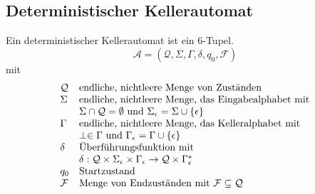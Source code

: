 \documentclass[]{beamer}
\begin{document}
\subsection{Deterministischer Kellerautomat}
\begin{frame}[squeeze]{}
  \begin{definition}
    Ein deterministischer Kellerautomat ist ein 6-Tupel.
    \[\mathcal{A} = (\mathcal{Q}, \Sigma, \Gamma, \delta, q_0, \mathcal{F})\]
    mit
    \[\begin{array}{l l}
        \mathcal{Q} & \text{endliche, nichtleere Menge von Zuständen} \\
        \Sigma      & \text{endliche, nichtleere Menge, das Eingabealphabet mit} \\
                    & \Sigma \cap \mathcal{Q} = \emptyset \text{ und } \Sigma_\epsilon = \Sigma \cup \{\epsilon\} \\
        \Gamma      & \text{endliche, nichtleere Menge, das Kelleralphabet mit} \\
                    & \perp \in \Gamma \text{ und } \Gamma_\epsilon = \Gamma \cup \{\epsilon\} \\
        \delta      & \text{Überführungsfunktion mit } \\
                    &\delta : \mathcal{Q} \times \Sigma_\epsilon \times \Gamma_\epsilon \rightarrow \mathcal{Q} \times \Gamma_\epsilon^*\\
        q_0         & \text{Startzustand} \\
        \mathcal{F} & \text{Menge von Endzuständen mit } \mathcal{F} \subseteq \mathcal{Q} \\
      \end{array}\]
  \end{definition}
\end{frame}
\end{document}
